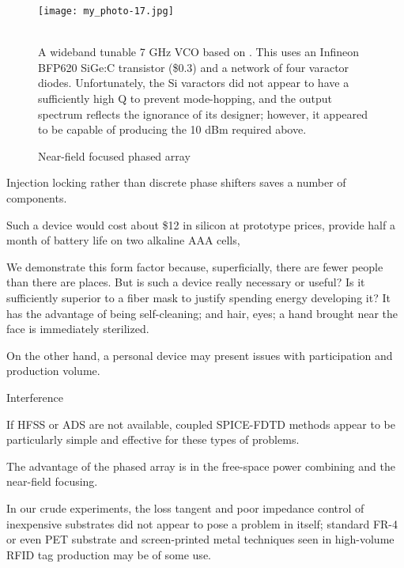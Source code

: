 \documentclass[paper.tex]{subfiles}
\begin{document}
\begin{figure}[H]
	\captionsetup{singlelinecheck = false, justification=justified}
	\centering
	\texttt{[image: my\_photo-17.jpg]}
	\caption{\\ A wideband tunable 7 GHz VCO based on \cite{TripleTuned2008}. This uses an Infineon BFP620 SiGe:C transistor (\$0.3) and a network of four varactor diodes. Unfortunately, the Si varactors did not appear to have a sufficiently high Q to prevent mode-hopping, and the output spectrum reflects the ignorance of its designer; however, it appeared to be capable of producing the 10 dBm required above.}
\end{figure}



\begin{figure}[H]
	\captionsetup{singlelinecheck = false, justification=justified}
	\centering
	
	\caption{Near-field focused phased array}
\end{figure}





Injection locking rather than discrete phase shifters saves a number of components.

Such a device would cost about \$12 in silicon at prototype prices, provide half a month of battery life on two alkaline AAA cells, 


We demonstrate this form factor because, superficially, there are fewer people than there are places. But is such a device really necessary or useful? Is it sufficiently superior to a fiber mask to justify spending energy developing it? It has the advantage of being self-cleaning; and hair, eyes; a hand brought near the face is immediately sterilized.


On the other hand, a personal device may present issues with participation and production volume. 

Interference

If HFSS or ADS are not available, coupled SPICE-FDTD methods appear to be particularly simple and effective for these types of problems.

The advantage of the phased array is in the free-space power combining and the near-field focusing.

In our crude experiments, the loss tangent and poor impedance control of inexpensive substrates did not appear to pose a problem in itself; standard FR-4 or even PET substrate and screen-printed metal techniques seen in high-volume RFID tag production may be of some use. 
\end{document}
